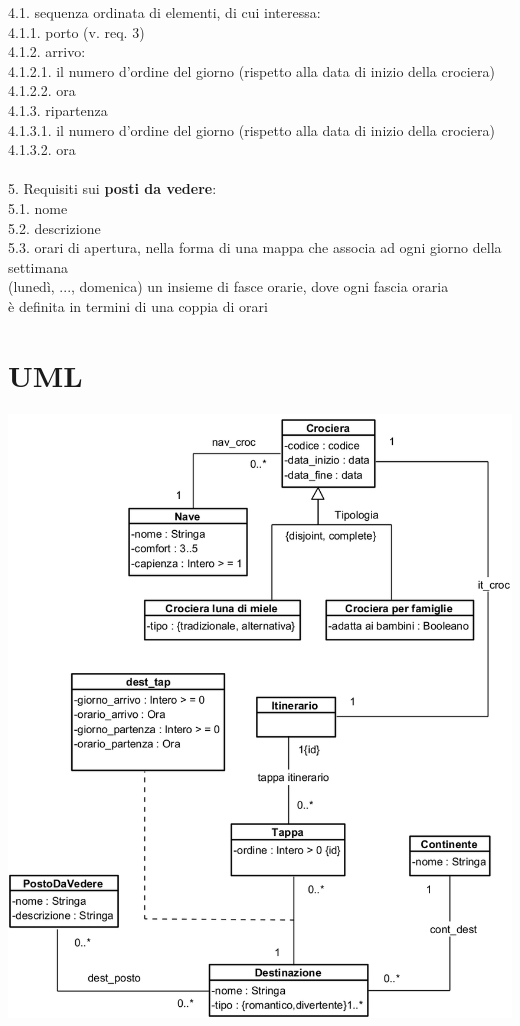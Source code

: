 \documentclass[12pt, letterpaper]{article}
\newcommand{\acc}{\\\hphantom{}\\}
\begin{document}
\hphantom{ident}4.1. sequenza ordinata di elementi, di cui interessa:\\
\hphantom{ident}\hphantom{ident}4.1.1. porto (v. req. 3)\\
\hphantom{ident}\hphantom{ident}4.1.2. arrivo:\\
\hphantom{ident}\hphantom{ident}\hphantom{ident}4.1.2.1. il numero d'ordine del giorno (rispetto alla data di inizio della crociera)\\
\hphantom{ident}\hphantom{ident}\hphantom{ident}4.1.2.2. ora\\
\hphantom{ident}\hphantom{ident}4.1.3. ripartenza	\\
\hphantom{ident}\hphantom{ident}\hphantom{ident}4.1.3.1. il numero d'ordine del giorno (rispetto alla data di inizio della crociera)\\
\hphantom{ident}\hphantom{ident}\hphantom{ident}4.1.3.2. ora
\acc
5. Requisiti sui \textbf{posti da vedere}:\\
\hphantom{ident}5.1. nome\\
\hphantom{ident}5.2. descrizione\\
\hphantom{ident}5.3. orari di apertura, nella forma di una mappa che associa ad ogni giorno della settimana\\
\hphantom{ident}\hphantom{ident}(lunedì, ..., domenica) un insieme di fasce orarie, dove ogni fascia oraria\\
\hphantom{ident}\hphantom{ident}è definita in termini di una coppia di orari

\newpage
\section{UML}\begin{center}
    
    \includegraphics[width=\textwidth]{images/UML.png}
\end{center}
\end{document}
